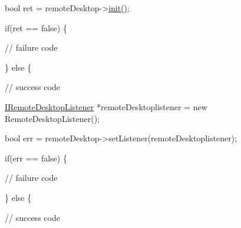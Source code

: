 \begin{DoxyPre}  bool ret = remoteDesktop->\hyperlink{classknoxremotedesktop_1_1IRemoteDesktop_a7bed40d98c61713a69cf1dad8b37beae}{init()};\end{DoxyPre}



\begin{DoxyPre}  if(ret == false)  \{\end{DoxyPre}



\begin{DoxyPre}     // failure code\end{DoxyPre}



\begin{DoxyPre}  \} else \{\end{DoxyPre}



\begin{DoxyPre}     // success code\end{DoxyPre}



\begin{DoxyPre}     \hyperlink{classknoxremotedesktop_1_1IRemoteDesktopListener}{IRemoteDesktopListener} *remoteDesktoplistener = new RemoteDesktopListener();\end{DoxyPre}



\begin{DoxyPre}     bool err = remoteDesktop->setListener(remoteDesktoplistener);\end{DoxyPre}



\begin{DoxyPre}     if(err == false)  \{\end{DoxyPre}



\begin{DoxyPre}         // failure code\end{DoxyPre}



\begin{DoxyPre}     \} else \{\end{DoxyPre}



\begin{DoxyPre}         // success code\end{DoxyPre}



